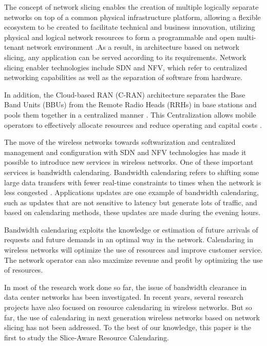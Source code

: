 \documentclass[conference]{IEEEtran}
\begin{document}
The concept of network slicing enables the creation of multiple logically separate networks on top of a common physical infrastructure platform, allowing a flexible ecosystem to be created to facilitate technical and business innovation, utilizing physical and logical network resources to form a programmable and open multi-tenant network environment \cite{afolabi2018network}.As a result, in architecture based on network slicing, any application can be served according to its requirements. Network slicing enabler technologies include SDN and NFV, which refer to centralized networking capabilities as well as the separation of software from hardware. 

In addition, the Cloud-based RAN (C-RAN) architecture separates the Base Band Units (BBUs) from the Remote Radio Heads (RRHs) in base stations and pools them together in a centralized manner \cite{morais2020sdn}. This Centralization allows mobile operators to effectively allocate resources and reduce operating and capital costs \cite{elias2018radio}.

The move of the wireless networks towards softwarization and centralized management and configuration with SDN and NFV technologies has made it possible to introduce new services in wireless networks. One of these important services is bandwidth calendaring. Bandwidth calendaring refers to shifting some large data transfers with fewer real-time constraints to times when the network is less congested \cite{gkatzikis2016bandwidth}. Applications updates are one example of bandwidth calendaring, such as updates that are not sensitive to latency but generate lots of traffic, and based on calendaring methods, these updates are made during the evening hours. 

Bandwidth calendaring exploits the knowledge or estimation of future arrivals of requests and future demands in an optimal way in the network. Calendaring in wireless networks will optimize the use of resources and improve customer service. The network operator can also maximize revenue and profit by optimizing the use of resources.

In most of the research work done so far, the issue of bandwidth clearance in data center networks has been investigated. In recent years, several research projects have also focused on resource calendaring in wireless networks. But so far, the use of calendaring in next generation wireless networks based on network slicing has not been addressed. To the best of our knowledge, this paper is the ﬁrst to study the Slice-Aware Resource Calendaring.
\end{document}
